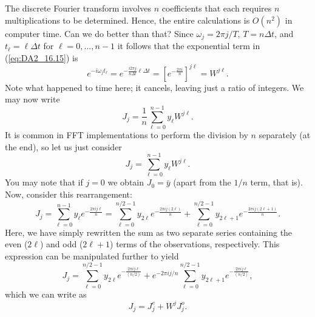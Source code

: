 The discrete Fourier transform involves $n$ coefficients that each requires $n$ multiplications to be determined.
Hence, the entire calculations is $O(n^2)$ in computer time.  Can we do better than that?
Since $\omega_j = 2 \pi j / T$, $T = n \Delta t$, and $t_\ell = \ell \Delta t$ for $\ell =0, ..., n-1$ it follows that the exponential term
in (\ref{eq:DA2_16.15}) is
\begin{equation}
e^{ -i \omega_j t_{\ell}} = e^{-\frac{i 2 \pi j}{n \Delta t}\ell \Delta t} = \left [ e^{-\frac{2 \pi i}{n}} \right ]^{j\ell} = W^{j\ell}.
\end{equation}
Note what happened to time here; it cancels, leaving just a ratio of integers.
We may now write
\begin{equation}
J_j = \displaystyle \frac{1}{n} \sum^{n-1}_{\ell=0} y_{\ell} W^{j\ell}.
\end{equation}
It is common in FFT implementations to perform the division by $n$ separately (at the end), so let us just consider
\begin{equation}
J_j = \displaystyle \sum^{n-1}_{\ell=0} y_{\ell} W^{j\ell}.
\end{equation}
You may note that if $j = 0$ we obtain $J_0 = \bar{y}$ (apart from the $1/n$ term, that is).  Now, consider this rearrangement:
\begin{equation}
J_j = \displaystyle \sum^{n-1}_{\ell=0} y_{\ell} e^{-\frac{2 \pi i j\ell}{n}} =
	\sum^{n/2-1}_{\ell=0} y_{2\ell} e^{-\frac{2 \pi i j (2\ell)}{n}} +
	\sum^{n/2-1}_{\ell=0} y_{2\ell+1} e^{-\frac{2 \pi i j (2\ell+1)}{n}}.	
\end{equation}
Here, we have simply rewritten the sum as two separate series containing the even ($2 \ell$) and odd ($2 \ell + 1$) terms of
the observations, respectively.  This expression can be manipulated further to yield
\begin{equation}
J_j = \displaystyle \sum^{n/2-1}_{\ell=0} y_{2\ell} e^{-\frac{2 \pi i j \ell}{(n/2)}} +
	e^{-2 \pi i j / n} \sum^{n/2-1}_{\ell=0} y_{2\ell+1} e^{-\frac{2 \pi i j \ell}{(n/2)}},
\label{eq:FFT1}
\end{equation}
which we can write as
\begin{equation}
J_j = J_j^e + W^j J_j^o.
\end{equation}

